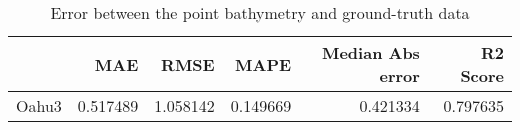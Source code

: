 \begin{table}[h!]
\caption{Error between the point bathymetry and ground-truth data}
\label{tab:Oahu3_lidar_error}
\begin{tabular}{lrrrrr}
\toprule
 & MAE & RMSE & MAPE & Median Abs error & R2 Score \\
\midrule
Oahu3 & 0.517489 & 1.058142 & 0.149669 & 0.421334 & 0.797635 \\
\bottomrule
\end{tabular}
\end{table}
